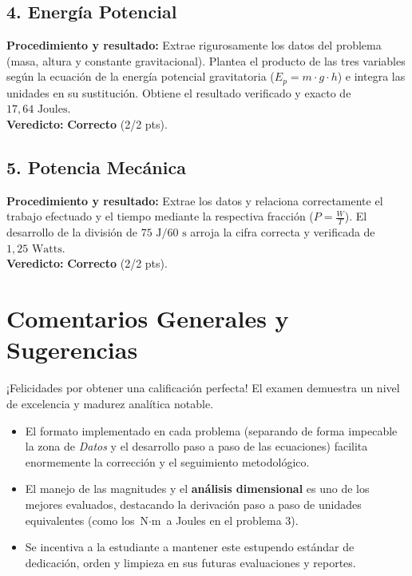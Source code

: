 \documentclass[12pt,letterpaper]{article}
\begin{document}
\subsection*{4. Energía Potencial}
\textbf{Procedimiento y resultado:} Extrae rigurosamente los datos del problema (masa, altura y constante gravitacional). Plantea el producto de las tres variables según la ecuación de la energía potencial gravitatoria ($E_p = m \cdot g \cdot h$) e integra las unidades en su sustitución. Obtiene el resultado verificado y exacto de $17,64 \text{ Joules}$. \\
\textbf{Veredicto:} \textbf{Correcto} (2/2 pts).

\subsection*{5. Potencia Mecánica}
\textbf{Procedimiento y resultado:} Extrae los datos y relaciona correctamente el trabajo efectuado y el tiempo mediante la respectiva fracción ($P = \frac{W}{T}$). El desarrollo de la división de $75 \text{ J} / 60 \text{ s}$ arroja la cifra correcta y verificada de $1,25 \text{ Watts}$. \\
\textbf{Veredicto:} \textbf{Correcto} (2/2 pts).

\vspace{0.5cm}
\section*{Comentarios Generales y Sugerencias}
¡Felicidades por obtener una calificación perfecta! El examen demuestra un nivel de excelencia y madurez analítica notable.
\begin{itemize}
    \item El formato implementado en cada problema (separando de forma impecable la zona de \textit{Datos} y el desarrollo paso a paso de las ecuaciones) facilita enormemente la corrección y el seguimiento metodológico.
    \item El manejo de las magnitudes y el \textbf{análisis dimensional} es uno de los mejores evaluados, destacando la derivación paso a paso de unidades equivalentes (como los $\text{N} \cdot \text{m}$ a Joules en el problema 3).
    \item Se incentiva a la estudiante a mantener este estupendo estándar de dedicación, orden y limpieza en sus futuras evaluaciones y reportes.
\end{itemize}
\end{document}
